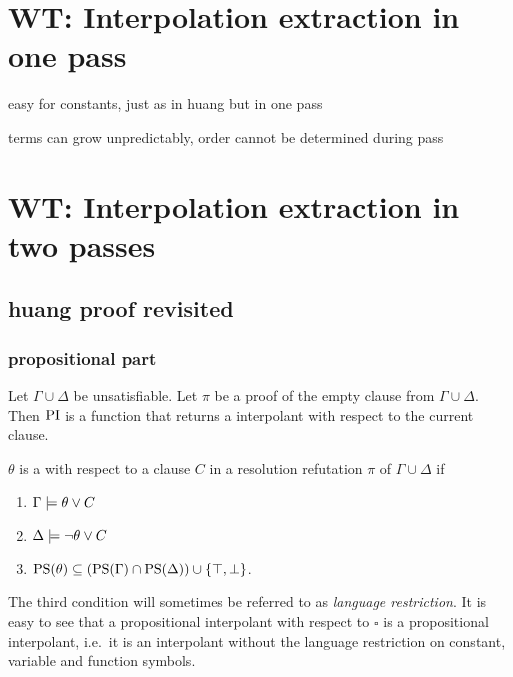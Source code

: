 
\section{WT: Interpolation extraction in one pass}

easy for constants, just as in huang but in one pass

terms can grow unpredictably, order cannot be determined during pass

\section{WT: Interpolation extraction in two passes}

\subsection{huang proof revisited}

\subsubsection{propositional part}

Let $\Gamma \cup \Delta$ be unsatisfiable. Let $\pi$ be a proof of the empty clause from $\Gamma \cup \Delta$. Then $\operatorname{PI}$ is a function that returns a interpolant with respect to the current clause. 

\begin{defi}
	$\theta$ is a  with respect to a clause $C$ in a resolution refutation $\pi$ of $\Gamma \cup \Delta$ if 
	\label{def:rel_prop_interpol}
	\begin{enumerate}
		\item $\Gamma \models \theta \lor C$
			\label{rel_prop_interpol_cond1}
		\item $\Delta \models \lnot \theta \lor C$
			\label{rel_prop_interpol_cond2}
		\item $\operatorname{PS}(\theta) \subseteq (\operatorname{PS}(\Gamma) \cap \operatorname{PS}(\Delta)) \cup \{\top, \bot\} $.
			\label{rel_prop_interpol_cond_lang}
			\qedhere
	\end{enumerate}
\end{defi}

The third condition will sometimes be referred to as \emph{language restriction}.
It is easy to see that a propositional interpolant with respect to $\square$ is a propositional interpolant, i.e.~it is an interpolant without the language restriction on constant, variable and function symbols.

